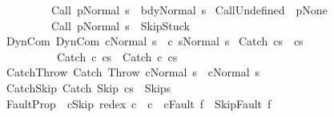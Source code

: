 \begin{isabellebody}
\ \ \ \ \ \ \ \ \ {\isasymGamma}{\isasymturnstile}{\isacharparenleft}Call\ p{\isacharcomma}Normal\ s{\isacharparenright}\ {\isasymrightarrow}\ {\isacharparenleft}bdy{\isacharcomma}Normal\ s{\isacharparenright}{\isachardoublequoteclose}\isanewline
\isanewline
{\isacharbar}\ CallUndefined{\isacharcolon}\ {\isachardoublequoteopen}{\isasymGamma}\ p{\isacharequal}None\ {\isasymLongrightarrow}\isanewline
\ \ \ \ \ \ \ \ \ {\isasymGamma}{\isasymturnstile}{\isacharparenleft}Call\ p{\isacharcomma}Normal\ s{\isacharparenright}\ {\isasymrightarrow}\ {\isacharparenleft}Skip{\isacharcomma}Stuck{\isacharparenright}{\isachardoublequoteclose}\isanewline
\isanewline
{\isacharbar}\ DynCom{\isacharcolon}\ {\isachardoublequoteopen}{\isasymGamma}{\isasymturnstile}{\isacharparenleft}DynCom\ c{\isacharcomma}Normal\ s{\isacharparenright}\ {\isasymrightarrow}\ {\isacharparenleft}c\ s{\isacharcomma}Normal\ s{\isacharparenright}{\isachardoublequoteclose}\isanewline
\isanewline
{\isacharbar}\ Catch{\isacharcolon}\ {\isachardoublequoteopen}{\isasymlbrakk}{\isasymGamma}{\isasymturnstile}{\isacharparenleft}cs{\isacharparenright}\ {\isasymrightarrow}\ {\isacharparenleft}cs{\isacharprime}{\isacharparenright}{\isasymrbrakk}\isanewline
\ \ \ \ \ \ \ \ \ \ {\isasymLongrightarrow}\isanewline
\ \ \ \ \ \ \ \ \ \ {\isasymGamma}{\isasymturnstile}{\isacharparenleft}Catch\ c\ cs{\isacharparenright}\ {\isasymrightarrow}\ {\isacharparenleft}Catch\ c\ cs{\isacharprime}{\isacharparenright}{\isachardoublequoteclose}\isanewline
\isanewline
{\isacharbar}\ CatchThrow{\isacharcolon}\ {\isachardoublequoteopen}{\isasymGamma}{\isasymturnstile}{\isacharparenleft}Catch\ Throw\ cNormal\ s{\isacharparenright}\ {\isasymrightarrow}\ {\isacharparenleft}cNormal\ s{\isacharparenright}{\isachardoublequoteclose}\isanewline
{\isacharbar}\ CatchSkip{\isacharcolon}\ {\isachardoublequoteopen}{\isasymGamma}{\isasymturnstile}{\isacharparenleft}Catch\ Skip\ cs{\isacharparenright}\ {\isasymrightarrow}\ {\isacharparenleft}Skip{\isacharcomma}s{\isacharparenright}{\isachardoublequoteclose}\isanewline
\isanewline
{\isacharbar}\ FaultProp{\isacharcolon}\ \ {\isachardoublequoteopen}{\isasymlbrakk}c{\isasymnoteq}Skip{\isacharsemicolon}\ redex\ c\ {\isacharequal}\ c{\isasymrbrakk}\ {\isasymLongrightarrow}\ {\isasymGamma}{\isasymturnstile}{\isacharparenleft}c{\isacharcomma}Fault\ f{\isacharparenright}\ {\isasymrightarrow}\ {\isacharparenleft}Skip{\isacharcomma}Fault\ f{\isacharparenright}{\isachardoublequoteclose}\isanewline

\end{isabellebody}
